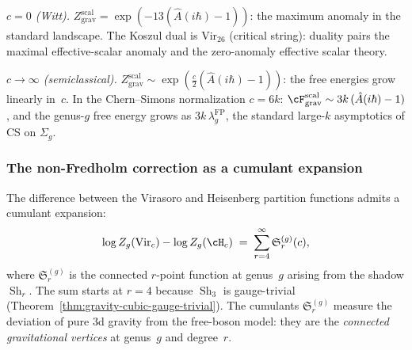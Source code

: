 \emph{$c = 0$ (Witt).}\enspace
$Z_{\mathrm{grav}}^{\mathrm{scal}} = \exp(-13(\hat A(i\hbar)-1))$:
the maximum anomaly in the standard landscape. The
Koszul dual is $\mathrm{Vir}_{26}$ (critical string):
duality pairs the maximal effective-scalar anomaly and the
zero-anomaly effective scalar theory.

\emph{$c \to \infty$ (semiclassical).}\enspace
$Z_{\mathrm{grav}}^{\mathrm{scal}} \sim \exp\left(\frac{c}{2}(\hat A(i\hbar)-1)
\right)$: the free energies grow linearly in~$c$. In the
Chern--Simons normalization $c = 6k$:
$\cF_{\mathrm{grav}}^{\mathrm{scal}} \sim 3k\,(\hat A(i\hbar)-1)$, and the genus-$g$ free energy
grows as $3k\,\lambda_g^{\mathrm{FP}}$, the standard
large-$k$ asymptotics of CS on $\Sigma_g$.

\subsubsection*{The non-Fredholm correction as a cumulant expansion}

\begin{remark}
\label{rem:gravity-cumulant-interpretation}
The difference between the Virasoro and Heisenberg partition
functions admits a cumulant expansion:
\[
\log Z_g(\mathrm{Vir}_c)
- \log Z_g(\cH_c)
\;=\;
\sum_{r=4}^{\infty}
\mathfrak{S}_r^{(g)}(c),
\]
where $\mathfrak{S}_r^{(g)}$ is the connected $r$-point
function at genus~$g$ arising from the shadow
$\operatorname{Sh}_r$. The sum starts at $r = 4$ because
$\operatorname{Sh}_3$ is gauge-trivial
(Theorem~\ref{thm:gravity-cubic-gauge-trivial}). The cumulants
$\mathfrak{S}_r^{(g)}$ measure the deviation of pure 3d
gravity from the free-boson model: they are the
\emph{connected gravitational vertices} at genus~$g$ and degree~$r$.
\end{remark}

